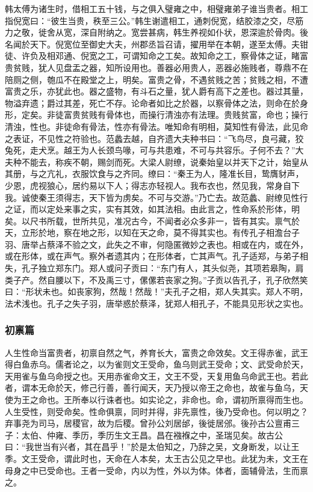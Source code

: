 \documentclass[]{article}
\begin{document}
韩太傅为诸生时，借相工五十钱，与之俱入璧雍之中，相璧雍弟子谁当贵者。相工指倪宽曰：``彼生当贵，秩至三公。''韩生谢遣相工，通刺倪宽，结胶漆之交，尽筋力之敬，徙舍从宽，深自附纳之。宽尝甚病，韩生养视如仆状，恩深逾於骨肉。後名闻於天下。倪宽位至御史大夫，州郡丞旨召请，擢用举在本朝，遂至太傅。夫钳徒、许负及相邓通、倪宽之工，可谓知命之工矣。故知命之工，察骨体之证，睹富贵贫贱，犹人见盘盂之器，知所设用也。善器必用贵人，恶器必施贱者，尊鼎不在陪厕之侧，匏瓜不在殿堂之上，明矣。富贵之骨，不遇贫贱之苦；贫贱之相，不遭富贵之乐，亦犹此也。器之盛物，有斗石之量，犹人爵有高下之差也。器过其量，物溢弃遗；爵过其差，死亡不存。论命者如比之於器，以察骨体之法，则命在於身形，定矣。非徒富贵贫贱有骨体也，而操行清浊亦有法理。贵贱贫富，命也；操行清浊，性也。非徒命有骨法，性亦有骨法。唯知命有明相，莫知性有骨法，此见命之表证，不见性之符验也。范蠡去越，自齐遗大夫种书曰：``飞鸟尽，良弓藏，狡兔死，走犬烹。越王为人长颈鸟喙，可与共患难，不可与共容乐。子何不去？''大夫种不能去，称疾不朝，赐剑而死。大梁人尉缭，说秦始皇以并天下之计，始皇从其册，与之亢礼，衣服饮食与之齐同。缭曰：``秦王为人，隆准长目，鸷膺豺声，少恩，虎视狼心，居约易以下人；得志亦轻视人。我布衣也，然见我，常身自下我。诚使秦王须得志，天下皆为虏矣。不可与交游。''乃亡去。故范蠡、尉缭见性行之证，而以定处来事之实，实有其效，如其法相。由此言之，性命系於形体，明矣。以尺书所载，世所共见，准况古今，不闻者必众多非一，皆有其实。禀气於天，立形於地，察在地之形，以知在天之命，莫不得其实也。有传孔子相澹台子羽、唐举占蔡泽不验之文，此失之不审，何隐匿微妙之表也。相或在内，或在外，或在形体，或在声气。察外者遗其内；在形体者，亡其声气。孔子适郑，与弟子相失，孔子独立郑东门。郑人或问子贡曰：``东门有人，其头似尧，其项若皋陶，肩类子产。然自腰以下，不及禹三寸，傫傫若丧家之狗。''子贡以告孔子，孔子欣然笑曰：``形状未也。如丧家狗，然哉！然哉！''夫孔子之相，郑人失其实。郑人不明，法术浅也。孔子之失子羽，唐举惑於蔡泽，犹郑人相孔子，不能具见形状之实也。

\hypertarget{header-n113}{%
\subsubsection{初禀篇}\label{header-n113}}

人生性命当富贵者，初禀自然之气，养育长大，富贵之命效矣。文王得赤雀，武王得白鱼赤乌。儒者论之，以为雀则文王受命，鱼乌则武王受命；文、武受命於天，天用雀与鱼乌命授之也。天用赤雀命文王，文王不受，天复用鱼乌命武王也。若此者，谓本无命於天，修己行善，善行闻天，天乃授以帝王之命也，故雀与鱼乌，天使为王之命也。王所奉以行诛者也。如实论之，非命也。命，谓初所禀得而生也。人生受性，则受命矣。性命俱禀，同时并得，非先禀性，後乃受命也。何以明之？弃事尧为司马，居稷官，故为后稷。曾孙公刘居邰，後徙居邠。後孙古公亶甫三子：太伯、仲雍、季历，季历生文王昌。昌在襁褓之中，圣瑞见矣。故古公曰：``我世当有兴者，其在昌乎！''於是太伯知之，乃辞之吴，文身断发，以让王季。文王受命，谓此时也，天命在人本矣，太王古公见之早也。此犹为未，文王在母身之中已受命也。王者一受命，内以为性，外以为体。体者，面辅骨法，生而禀之。
\end{document}
